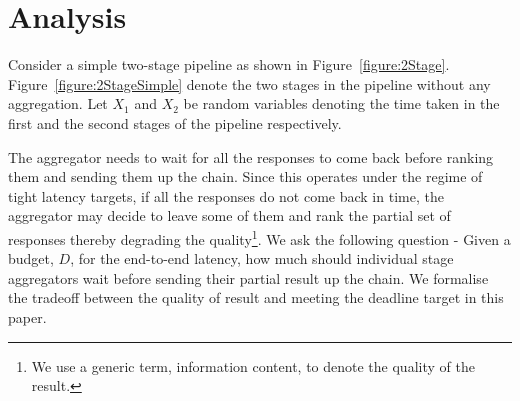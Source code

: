 \documentclass[letterpaper,twocolumn,10pt]{article}
\begin{document}
\section{Analysis}
Consider a simple two-stage pipeline as shown in Figure~\ref{figure:2Stage}. 
Figure~\ref{figure:2StageSimple} denote the two stages in the pipeline without any aggregation. 
Let $X_1$ and $X_2$ be random variables denoting the time taken in the first and the second stages of the pipeline respectively. 


The aggregator needs to wait for all the responses to come back before ranking them and sending them up the chain.
Since this operates under the regime of tight latency targets, if all the responses do not come back in time, the aggregator may decide to leave some of them and rank the partial set of responses thereby degrading the quality\footnote{We use a generic term, information content, to denote the quality of the result. }. We ask the following question - Given a budget, $D$, for the end-to-end latency, how much should individual stage aggregators wait before sending their partial result up the chain. We formalise the tradeoff between the quality of result and meeting the deadline target in this paper. 
\end{document}
